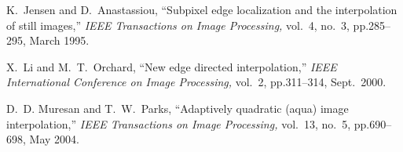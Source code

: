 \documentclass[a4paper,10pt]{ikelab-seminar}
\begin{document}
\begin{thebibliography}{99}
     K.~Jensen and D.~Anastassiou,
     ``Subpixel edge localization and the interpolation of still images,''
     \textit{IEEE Transactions on Image Processing,}
     vol.~4, no.~3, pp.285--295, March 1995.

     X.~Li and M.~T.~Orchard,
     ``New edge directed interpolation,''
     \textit{IEEE International Conference on Image Processing,}
     vol.~2, pp.311--314, Sept.\ 2000.

     D.~D. Muresan and T.~W.~Parks,
     ``Adaptively quadratic (aqua) image interpolation,''
     \textit{IEEE Transactions on Image Processing,}
     vol.~13, no.~5, pp.690--698, May 2004.

\end{thebibliography}
\end{document}
